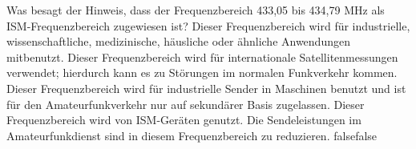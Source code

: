     {Was besagt der Hinweis, dass der Frequenzbereich 433,05 bis 434,79 MHz als ISM-Frequenzbereich zugewiesen ist?}
    {Dieser Frequenzbereich wird für industrielle, wissenschaftliche, medizinische, häusliche oder ähnliche Anwendungen mitbenutzt.}
    {Dieser Frequenzbereich wird für internationale Satellitenmessungen verwendet; hierdurch kann es zu Störungen im normalen Funkverkehr kommen.}
    {Dieser Frequenzbereich wird für industrielle Sender in Maschinen benutzt und ist für den Amateurfunkverkehr nur auf sekundärer Basis zugelassen.}
    {Dieser Frequenzbereich wird von ISM-Geräten genutzt. Die Sendeleistungen im Amateurfunkdienst sind in diesem Frequenzbereich zu reduzieren.}
    {false}{false}